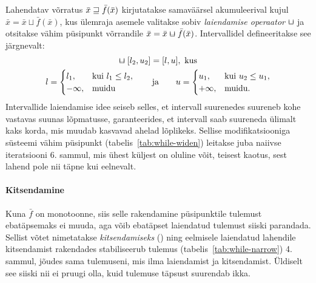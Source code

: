 \documentclass[../thesis.tex]{subfiles}
\begin{document}
Lahendatav võrratus $\bar{x} \sqsupseteq \bar{f}(\bar{x})$ kirjutatakse samaväärsel akumuleerival kujul $\bar{x} = \bar{x} \sqcup \bar{f}(\bar{x})$, kus ülemraja asemele valitakse sobiv \emph{laiendamise operaator} $\widen$ ja otsitakse vähim püsipunkt võrrandile $\bar{x} = \bar{x} \widen \bar{f}(\bar{x})$. Intervallidel defineeritakse see järgnevalt:
\begin{gather*}
	[l_1, u_1] \widen [l_2, u_2] = [l, u], \text{ kus} \\
	l = \begin{cases}
		l_1, & \text{kui } l_1 \leq l_2, \\
		-\infty, & \text{muidu}
	\end{cases}
	\qquad \text{ja} \qquad
	u = \begin{cases}
		u_1, & \text{kui } u_2 \leq u_1, \\
		+\infty, & \text{muidu}.
	\end{cases}
\end{gather*}
Intervallide laiendamise idee seiseb selles, et intervall suurenedes suureneb kohe vastavas suunas lõpmatusse, garanteerides, et intervall saab suureneda ülimalt kaks korda, mis muudab kasvavad ahelad lõplikeks. Sellise modifikatsiooniga süsteemi vähim püsipunkt (tabelis~\ref{tab:while-widen}) leitakse juba naiivse iteratsiooni 6. sammul, mis ühest küljest on oluline võit, teisest kaotus, sest lahend pole nii täpne kui eelnevalt.

\paragraph{Kitsendamine}
Kuna $\bar{f}$ on monotoonne, siis selle rakendamine püsipunktile tulemust ebatäpsemaks ei muuda, aga võib ebatäpset laiendatud tulemust siiski parandada. Sellist võtet nimetatakse \emph{kitsendamiseks} () ning eelmisele laiendatud lahendile kitsendamist rakendades stabiliseerub tulemus (tabelis~\ref{tab:while-narrow}) 4. sammul, jõudes sama tulemuseni, mis ilma laiendamist ja kitsendamist. Üldiselt see siiski nii ei pruugi olla, kuid tulemuse täpsust suurendab ikka.
\end{document}
